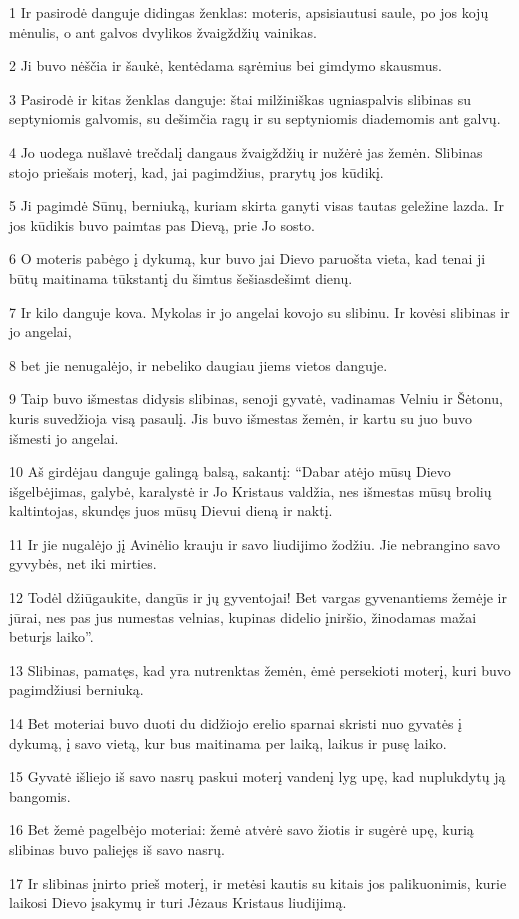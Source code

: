 \par 1 Ir pasirodė danguje didingas ženklas: moteris, apsisiautusi saule, po jos kojų mėnulis, o ant galvos dvylikos žvaigždžių vainikas. 
\par 2 Ji buvo nėščia ir šaukė, kentėdama sąrėmius bei gimdymo skausmus. 
\par 3 Pasirodė ir kitas ženklas danguje: štai milžiniškas ugniaspalvis slibinas su septyniomis galvomis, su dešimčia ragų ir su septyniomis diademomis ant galvų. 
\par 4 Jo uodega nušlavė trečdalį dangaus žvaigždžių ir nužėrė jas žemėn. Slibinas stojo priešais moterį, kad, jai pagimdžius, prarytų jos kūdikį. 
\par 5 Ji pagimdė Sūnų, berniuką, kuriam skirta ganyti visas tautas geležine lazda. Ir jos kūdikis buvo paimtas pas Dievą, prie Jo sosto. 
\par 6 O moteris pabėgo į dykumą, kur buvo jai Dievo paruošta vieta, kad tenai ji būtų maitinama tūkstantį du šimtus šešiasdešimt dienų. 
\par 7 Ir kilo danguje kova. Mykolas ir jo angelai kovojo su slibinu. Ir kovėsi slibinas ir jo angelai, 
\par 8 bet jie nenugalėjo, ir nebeliko daugiau jiems vietos danguje. 
\par 9 Taip buvo išmestas didysis slibinas, senoji gyvatė, vadinamas Velniu ir Šėtonu, kuris suvedžioja visą pasaulį. Jis buvo išmestas žemėn, ir kartu su juo buvo išmesti jo angelai. 
\par 10 Aš girdėjau danguje galingą balsą, sakantį: “Dabar atėjo mūsų Dievo išgelbėjimas, galybė, karalystė ir Jo Kristaus valdžia, nes išmestas mūsų brolių kaltintojas, skundęs juos mūsų Dievui dieną ir naktį. 
\par 11 Ir jie nugalėjo jį Avinėlio krauju ir savo liudijimo žodžiu. Jie nebrangino savo gyvybės, net iki mirties. 
\par 12 Todėl džiūgaukite, dangūs ir jų gyventojai! Bet vargas gyvenantiems žemėje ir jūrai, nes pas jus numestas velnias, kupinas didelio įniršio, žinodamas mažai beturįs laiko”. 
\par 13 Slibinas, pamatęs, kad yra nutrenktas žemėn, ėmė persekioti moterį, kuri buvo pagimdžiusi berniuką. 
\par 14 Bet moteriai buvo duoti du didžiojo erelio sparnai skristi nuo gyvatės į dykumą, į savo vietą, kur bus maitinama per laiką, laikus ir pusę laiko. 
\par 15 Gyvatė išliejo iš savo nasrų paskui moterį vandenį lyg upę, kad nuplukdytų ją bangomis. 
\par 16 Bet žemė pagelbėjo moteriai: žemė atvėrė savo žiotis ir sugėrė upę, kurią slibinas buvo paliejęs iš savo nasrų. 
\par 17 Ir slibinas įnirto prieš moterį, ir metėsi kautis su kitais jos palikuonimis, kurie laikosi Dievo įsakymų ir turi Jėzaus Kristaus liudijimą.


